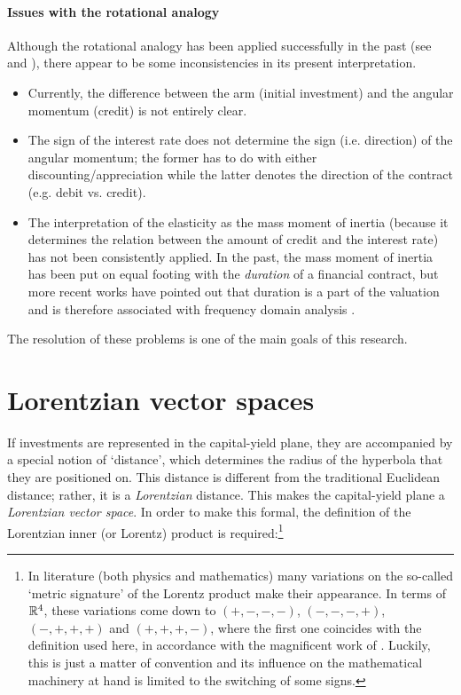 \paragraph{Issues with the rotational analogy} Although the rotational analogy has been applied successfully in the past (see \citet{Kruimer2021} and \citet{VanArdenne2020}), there appear to be some inconsistencies in its present interpretation. 
\begin{itemize}
    \item Currently, the difference between the arm (initial investment) and the angular momentum (credit) is not entirely clear.
    \item The sign of the interest rate does not determine the sign (i.e. direction) of the angular momentum; the former has to do with either discounting/appreciation while the latter denotes the direction of the contract (e.g. debit vs. credit).
    \item The interpretation of the elasticity as the mass moment of inertia (because it determines the relation between the amount of credit and the interest rate) has not been consistently applied. In the past, the mass moment of inertia has been put on equal footing with the \emph{duration} of a financial contract, but more recent works have pointed out that duration is a part of the valuation and is therefore associated with frequency domain analysis \cite{Krabbenborg2021}.
\end{itemize}
The resolution of these problems is one of the main goals of this research.

\section{Lorentzian vector spaces}
\label{sec:lorentz_metric}
If investments are represented in the capital-yield plane, they are accompanied by a special notion of `distance', which determines the radius of the hyperbola that they are positioned on. This distance is different from the traditional Euclidean distance; rather, it is a \emph{Lorentzian} distance. This makes the capital-yield plane a \emph{Lorentzian vector space}. In order to make this formal, the definition of the Lorentzian inner (or Lorentz) product is required:\footnote{In literature (both physics and mathematics) many variations on the so-called `metric signature' of the Lorentz product make their appearance. In terms of \(\mathbb{R}^4\), these variations come down to \((+,-,-,-)\), \((-,-,-,+)\), \((-,+,+,+)\) and \((+,+,+,-)\), where the first one coincides with the definition used here, in accordance with the magnificent work of \citet{Landau1971}. Luckily, this is just a matter of convention and its influence on the mathematical machinery at hand is limited to the switching of some signs.}

